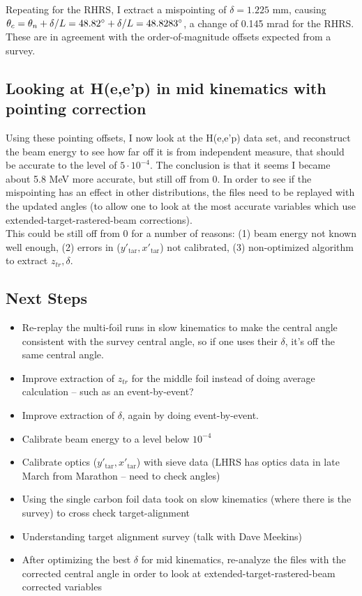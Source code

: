\documentclass{article}
\begin{document}
Repeating for the RHRS, I extract a mispointing of $\delta=1.225$ mm,  causing $\theta_c = \theta_n + \delta/L = 48.82\degree + \delta/L = 48.8283\degree$, a change of 0.145 mrad for the RHRS.\\

These are in agreement with the order-of-magnitude offsets expected from a survey.


\subsection*{Looking at H(e,e'p) in mid kinematics with pointing correction}
Using these pointing offsets, I now look at the H(e,e'p) data set, and reconstruct the beam energy to see how far off it is from independent measure, that should be accurate to the level of $5\cdot10^{-4}$. The conclusion is that it seems I became about 5.8 MeV more accurate, but still off from 0. In order to see if the mispointing has an effect in other distributions, the files need to be replayed with the updated angles (to allow one to look at the most accurate variables which use extended-target-rastered-beam corrections).\\

This could be still off from 0 for a number of reasons: (1) beam energy not known well enough, (2) errors in ($y'_{\textrm{tar}},x'_{\textrm{tar}}$) not calibrated, (3) non-optimized algorithm to extract $z_{tr},\delta$.

\subsection*{Next Steps}
\begin{itemize}
\item{Re-replay the multi-foil runs in slow kinematics to make the central angle consistent with the survey central angle, so if one uses their $\delta$, it's off the same central angle.}
\item{Improve extraction of $z_{tr}$ for the middle foil instead of doing average calculation -- such as an event-by-event?}
\item{Improve extraction of $\delta$, again by doing event-by-event.}
\item{Calibrate beam energy to a level below $10^{-4}$}
\item{Calibrate optics ($y'_{\textrm{tar}},x'_{\textrm{tar}}$) with sieve data (LHRS has optics data in late March from Marathon -- need to check angles)}
\item{Using the single carbon foil data took on slow kinematics (where there is the survey) to cross check target-alignment}
\item{Understanding target alignment survey (talk with Dave Meekins)}
\item{After optimizing the best $\delta$ for mid kinematics, re-analyze the files with the corrected central angle in order to look at extended-target-rastered-beam corrected variables}
\end{itemize}
\end{document}

